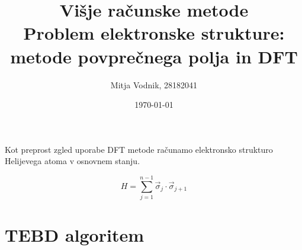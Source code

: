 \documentclass[a4paper]{article}
\newcommand{\s}{\sigma}
\newcommand{\vs}{\vec{\s}}
\begin{document}
    \title{\sc\large Višje računske metode\\
		\bigskip
		\bf\Large Problem elektronske strukture: metode povprečnega polja in DFT}
	\author{Mitja Vodnik, 28182041}
            \date{\today}
	\maketitle

    Kot preprost zgled uporabe DFT metode računamo elektronsko strukturo Helijevega atoma v osnovnem stanju.

    \begin{equation}\label{eq1}
        H = \sum_{j=1}^{n-1} \vs_j \cdot \vs_{j+1}
    \end{equation}

    \section{TEBD algoritem}

    \iffalse
    \begin{figure}
        \centering
        \texttt{[image: slika1.pdf]}
        \caption{Energije verige preračunane na delec. Najnižja vrednost, do katere pridemo na grafu je $E_0/n \approx -1.767$}
        \label{slika1}
    \end{figure}

    \begin{figure}
        \centering
        \begin{subfigure}{\textwidth}
            \texttt{[image: slika3a.pdf]}
        \end{subfigure}
        \begin{subfigure}{\textwidth}
            \texttt{[image: slika3b.pdf]}
        \end{subfigure}
        \caption{Prikaza matrik spinskih korelacij v osnovnem stanju dveh različno dolgih verig.}
        \label{slika3}
    \end{figure}
    \fi
\end{document}

